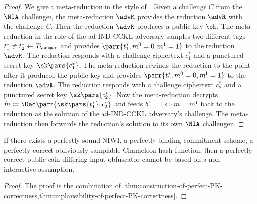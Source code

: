 \begin{proof}
    We give a meta-reduction in the style of \cite{EC:Coron02}.
    Given a challenge \(C\) from the \(\NIA\) challenger,
    the meta-reduction \(\advM\) provides the reduction \(\advR\) with the challenge \(C\).
    Then the reduction \(\advR\) produces a public key \(\pk\).
    The meta-reduction in the role of the ad-IND-CCKL adversary samples two different tags \(t^*_1 \neq t^*_2 \gets T_\secpar\) and provides \(\parr{t^*_1,m^0=0,m^1=1}\) to the reduction \(\advR\).
    The reduction responds with a challenge ciphertext \(c^*_1\) and a punctured secret key \(\sk\pars{c^*_1}\).
    The meta-reduction rewinds the reduction to the point after it produced the public key and provides \(\parr{t^*_2,m^0=0,m^1=1}\) to the reduction \(\advR\).
    The reduction responds with a challenge ciphertext \(c^*_2\) and a punctured secret key \(\sk\pars{c^*_2}\).
    Now the meta-reduction decrypts \(\widetilde{m} \coloneqq \Dec\parr{\sk\pars{t^*_1},c^*_2}\) and feeds \(b' = 1 \iff \widetilde{m} = m^1\) back to the reduction as the solution of the ad-IND-CCKL adversary's challenge.
    The meta-reduction then forwards the reduction's solution to its own \(\NIA\) challenger.
\end{proof}


\begin{theorem}
    If there exists a perfectly sound NIWI,
    a perfectly binding commitment scheme,
    a perfectly correct obliviously samplable Chameleon hash function,
    then a perfectly correct public-coin differing input obfuscator cannot be based on a non-interactive assumption.
\end{theorem}

\begin{proof}
    The proof is the combination of \cref{thm:construction-of-perfect-PK-correctness,thm:implausibility-of-perfect-PK-correctness}.
\end{proof}